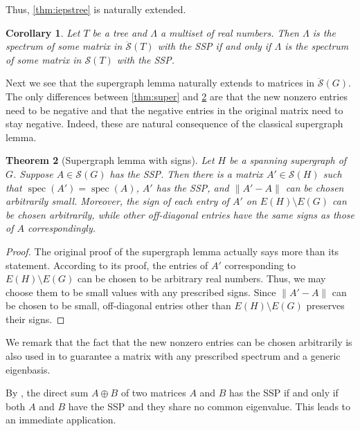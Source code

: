 \documentclass{article}
\newtheorem{theorem}{Theorem}[section]
\newtheorem{corollary}[theorem]{Corollary}
\theoremstyle{definition}
\newcommand{\spec}{\operatorname{spec}}
\newcommand{\mptn}{\mathcal{S}}
\newcommand{\mdso}{\ddot{\mathcal{S}}}
\begin{document}
Thus, \cref{thm:iepstree} is naturally extended.

\begin{corollary}
\label{cor:iepstree}
Let $T$ be a tree and $\Lambda$ a multiset of real numbers.  Then $\Lambda$ is the spectrum of some matrix in $\mdso(T)$ with the SSP if and only if $\Lambda$ is the spectrum of some matrix in $\mptn(T)$ with the SSP.  
\end{corollary}

Next we see that the supergraph lemma naturally extends to matrices in $\mdso(G)$.  The only differences between \cref{thm:super} and \cref{thm:supersign} are that the new nonzero entries need to be negative and that the negative entries in the original matrix need to stay negative.  Indeed, these are natural consequence of the classical supergraph lemma.


\begin{theorem}[Supergraph lemma with signs]
\label{thm:supersign}
Let $H$ be a spanning supergraph of $G$.  Suppose $A\in\mptn(G)$ has the SSP.  Then there is a matrix $A'\in\mptn(H)$ such that $\spec(A') = \spec(A)$, $A'$ has the SSP, and $\|A' - A\|$ can be chosen arbitrarily small.  Moreover, the sign of each entry of $A'$ on $E(H) \setminus E(G)$ can be chosen arbitrarily, while other off-diagonal entries have the same signs as those of $A$ correspondingly.
\end{theorem}
\begin{proof}
The original proof of the supergraph lemma \cite{gSAP} actually says more than its statement.  According to its proof, the entries of $A'$ corresponding to $E(H) \setminus E(G)$ can be chosen to be arbitrary real numbers.  Thus, we may choose them to be small values with any prescribed signs.  Since $\|A' - A\|$ can be chosen to be small, off-diagonal entries other than $E(H) \setminus E(G)$ preserves their signs.  
\end{proof}

We remark that the fact that the new nonzero entries can be chosen arbitrarily is also used in \cite{LOS24} to guarantee a matrix with any prescribed spectrum and a generic eigenbasis.

By \cite[Theorem~34]{gSAP}, the direct sum $A\oplus B$ of two matrices $A$ and $B$ has the SSP if and only if both $A$ and $B$ have the SSP and they share no common eigenvalue.  This leads to an immediate application.  
\end{document}
